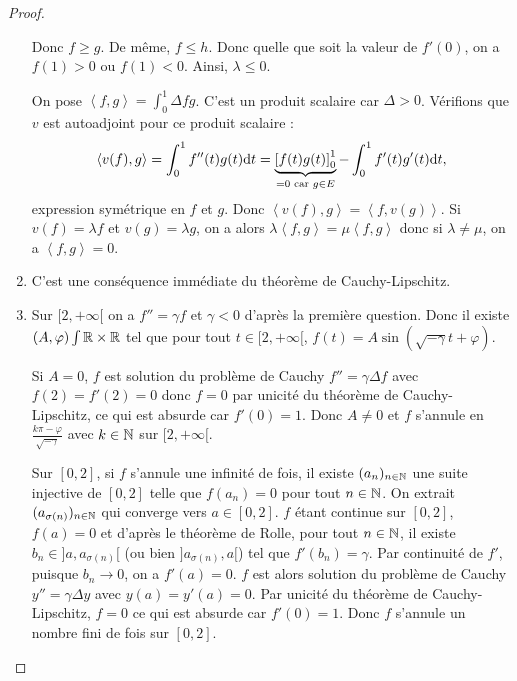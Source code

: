 \documentclass[12pt]{article}
\begin{document}
\begin{proof}
\begin{enumerate}
		Donc $f\geqslant g$. De même, $f\leqslant h$. Donc quelle que soit la valeur de $f'(0)$, on a $f(1)>0$ ou $f(1)<0$. Ainsi, $\lambda\leqslant0$.

		On pose $\left\langle f,g\right\rangle=\int_{0}^{1}\Delta fg$. C'est un produit scalaire car $\Delta>0$. Vérifions que $v$ est autoadjoint pour ce produit scalaire : 
		\begin{equation*}
			\left\langle v(f), g\right\rangle=\int_{0}^{1}f''(t)g(t)\mathrm{d} t=\underbrace{\left[f(t)g(t)\right]_{0}^{1}}_{=0\text{ car }g\in E}-\int_{0}^{1}f'(t)g'(t)\mathrm{d} t,
		\end{equation*}
		expression symétrique en $f$ et $g$. Donc $\left\langle v(f), g\right\rangle=\left\langle f, v(g)\right\rangle$. Si $v(f)=\lambda f$ et $v(g)=\lambda g$, on a alors $\lambda\left\langle f,g\right\rangle=\mu\left\langle f,g\right\rangle$ donc si $\lambda\neq\mu$, on a $\left\langle f,g\right\rangle=0$.

		\item C'est une conséquence immédiate du théorème de Cauchy-Lipschitz.
		\item Sur $[2,+\infty[$ on a $f''=\gamma f$ et $\gamma<0$ d'après la première question. Donc il existe $(A,\varphi)\int\mathbb{R}\times\mathbb{R}$ tel que pour tout $t\in[2,+\infty[$, $f(t)=A\sin\left(\sqrt{-\gamma}t+\varphi\right)$.
		
		Si $A=0$, $f$ est solution du problème de Cauchy $f''=\gamma\Delta f$ avec $f(2)=f'(2)=0$ donc $f=0$ par unicité du théorème de Cauchy-Lipschitz, ce qui est absurde car $f'(0)=1$. Donc $A\neq0$ et $f$ s'annule en $\frac{k\pi-\varphi}{\sqrt{-\gamma}}$ avec $k\in\mathbb{N}$ sur $[2,+\infty[$.

		Sur $[0,2]$, si $f$ s'annule une infinité de fois, il existe $(a_n)_{n\in\mathbb{N}}$ une suite injective de $[0,2]$ telle que $f(a_n)=0$ pour tout $n\in\mathbb{N}$. On extrait $(a_{\sigma(n)})_{n\in\mathbb{N}}$ qui converge vers $a\in[0,2]$. $f$ étant continue sur $[0,2]$, $f(a)=0$ et d'après le théorème de Rolle, pour tout $n\in\mathbb{N}$, il existe $b_n\in]a,a_{\sigma(n)}[$ (ou bien $]a_{\sigma(n)},a[$) tel que $f'(b_n)=\gamma$. Par continuité de $f'$, puisque $b_n\to0$, on a $f'(a)=0$. $f$ est alors solution du problème de Cauchy $y''=\gamma\Delta y$ avec $y(a)=y'(a)=0$. Par unicité du théorème de Cauchy-Lipschitz, $f=0$ ce qui est absurde car $f'(0)=1$. Donc $f$ s'annule un nombre fini de fois sur $[0,2]$.


\end{enumerate}
\end{proof}
\end{document}
